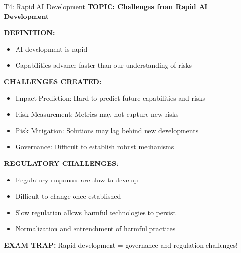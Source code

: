 \documentclass[8pt]{beamer}
\begin{document}
	\begin{frame}{T4: Rapid AI Development}
		\fontsize{6.5}{7.5}\selectfont
		\textbf{TOPIC: Challenges from Rapid AI Development}
		
		\vspace{0.1cm}
		\textbf{DEFINITION:}
		\begin{itemize}
			\item AI development is rapid
			\item Capabilities advance faster than our understanding of risks
		\end{itemize}
		
		\vspace{0.1cm}
		\textbf{CHALLENGES CREATED:}
		\begin{itemize}
			\item \textcolor{myblue}{Impact Prediction:} Hard to predict future capabilities and risks
			\item \textcolor{myblue}{Risk Measurement:} Metrics may not capture new risks
			\item \textcolor{myblue}{Risk Mitigation:} Solutions may lag behind new developments
			\item \textcolor{myblue}{Governance:} Difficult to establish robust mechanisms
		\end{itemize}
		
		\vspace{0.1cm}
		\textbf{REGULATORY CHALLENGES:}
		\begin{itemize}
			\item Regulatory responses are slow to develop
			\item Difficult to change once established
			\item Slow regulation allows harmful technologies to persist
			\item Normalization and entrenchment of harmful practices
		\end{itemize}
		
		\textcolor{myred}{\textbf{EXAM TRAP:}} Rapid development = \textcolor{myblue}{governance and regulation challenges}!
	\end{frame}
	
\end{document}
